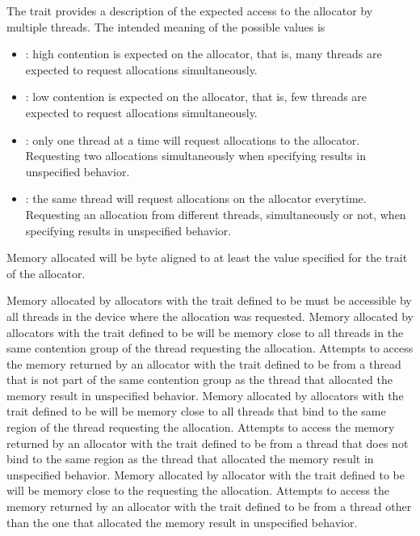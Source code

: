 The {} trait provides a description of the expected access to the allocator by multiple threads. The intended meaning of the possible values is
\begin{itemize}
 \item {}: high contention is expected on the allocator, that is, many threads are expected to request allocations simultaneously.
 \item {}: low contention is expected on the allocator, that is, few threads are expected to request allocations simultaneously.
 \item {}: only one thread at a time will request allocations to the allocator. Requesting two allocations simultaneously when specifying  results in unspecified behavior.
 \item {}: the same thread will request allocations on the allocator everytime. Requesting an allocation from different threads, simultaneously or not, when specifying  results in unspecified behavior.
\end{itemize}

Memory allocated will be byte aligned to at least the value specified for the {} trait of the allocator.

Memory allocated by allocators with the  trait defined to be  must be accessible by all threads in the device where the allocation was requested. Memory allocated by allocators with the  trait defined to be  will be memory close to all threads in the same contention group of the thread requesting the allocation. Attempts to access the memory returned by an allocator with the  trait defined to be  from a thread that is not part of the same contention group as the thread that allocated the memory result in unspecified behavior. Memory allocated by allocators with the  trait defined to be  will be memory close to all threads that bind to the same {} region of the thread requesting the allocation. Attempts to access the memory returned by  an allocator with the  trait defined to be  from a thread that does not bind to the same {} region as the thread that allocated the memory result in unspecified behavior. Memory allocated by allocator with the  trait defined to be  will be memory close to the {} requesting the allocation. Attempts to access the memory returned by an allocator with the  trait defined to be  from a thread other than the one that allocated the memory result in unspecified behavior.

